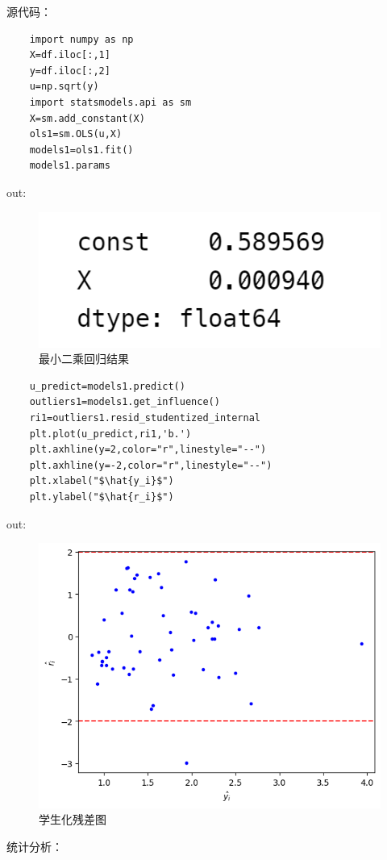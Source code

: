 \documentclass[a4paper,12pt]{article}
\begin{document}
源代码：
\begin{lstlisting}
	import numpy as np
	X=df.iloc[:,1]
	y=df.iloc[:,2]
	u=np.sqrt(y)
	import statsmodels.api as sm
	X=sm.add_constant(X)
	ols1=sm.OLS(u,X)
	models1=ols1.fit()
	models1.params
\end{lstlisting}
out: 
\begin{figure}[htbp]
	\centering
	\includegraphics[scale=0.6]{out3.png}
	\caption{最小二乘回归结果}
\end{figure}
\begin{lstlisting}
	u_predict=models1.predict()
	outliers1=models1.get_influence()
	ri1=outliers1.resid_studentized_internal
	plt.plot(u_predict,ri1,'b.')
	plt.axhline(y=2,color="r",linestyle="--")
	plt.axhline(y=-2,color="r",linestyle="--")
	plt.xlabel("$\hat{y_i}$")
	plt.ylabel("$\hat{r_i}$")
\end{lstlisting}
out: 
\begin{figure}[htbp]
	\centering
	\includegraphics[scale=0.5]{out4.png}
	\caption{学生化残差图}
\end{figure}

统计分析：
\end{document}
